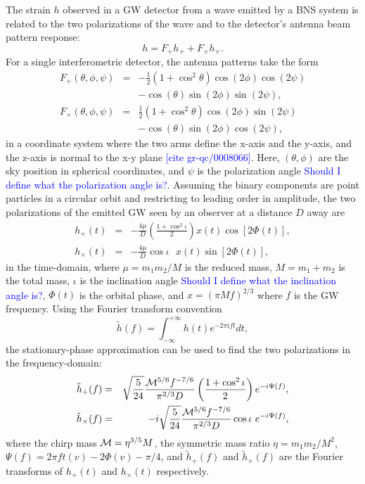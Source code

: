 \documentclass[twocolumn,prd,amssymb,aps,nofootinbib,showpacs,epsf]{revtex4}
\newcommand\les[2]{\textcolor{blue}{{#1}\sout{#2}}}
\begin{document}
The strain $h$ observed in a GW detector from a wave emitted by a BNS system is related to the two polarizations of the wave and to the detector's antenna beam pattern response:
\begin{equation}
h=F_+ h_+ + F_\times h_\times.
\end{equation}
For a single interferometric detector, the antenna patterns take the form
\begin{eqnarray}
F_+(\theta,\phi,\psi)&=&-\frac{1}{2}(1+\cos^2\theta)\cos(2\phi)\cos(2\psi)\\
\nonumber
&&-\cos(\theta)\sin(2\phi)\sin(2\psi),\\
F_\times(\theta,\phi,\psi)&=&\frac{1}{2}(1+\cos^2\theta)\cos(2\phi)\sin(2\psi)\\
\nonumber
&&-\cos(\theta)\sin(2\phi)\cos(2\psi),
\end{eqnarray}
in a coordinate system where the two arms define the x-axis and the y-axis, and the z-axis is normal to the x-y plane \les{[cite gr-qc/0008066]}{}.  Here, $(\theta, \phi)$ are the sky position in spherical coordinates, and $\psi$ is the polarization angle \les{Should I define what the polarization angle is?}{}.  Assuming the binary components are point particles in a circular orbit and restricting to leading order in amplitude, the two polarizations of the emitted GW seen by an observer at a distance $D$ away are
\begin{eqnarray}
\label{eq:hoftp}
h_+(t)&=&-\frac{4\mu}{D}\left(\frac{1+\cos^2\iota}{2}\right)x(t)\cos\left[2\Phi(t)\right],\\
\label{eq:hoftc}
h_\times(t)&=&-\frac{4\mu}{D}\cos\iota\mbox{ }x(t)\sin\left[2\Phi(t)\right],
\end{eqnarray}
in the time-domain, where $\mu=m_1 m_2/M$ is the reduced mass, $M=m_1+m_2$ is the total mass, $\iota$ is the inclination angle \les{Should I define what the inclination angle is?}{}, $\Phi(t)$ is the orbital phase, and $x=(\pi M f)^{2/3}$ where $f$ is the GW frequency.  Using the Fourier transform convention
\begin{equation}
\tilde{h}(f)=\int_{-\infty}^{+\infty} h(t) e^{-2\pi i f t}dt,
\end{equation}
the stationary-phase approximation can be used to find the two polarizations in the frequency-domain:
\begin{eqnarray}
\label{eq:hoffp}
\tilde{h}_+(f)&=&\sqrt{\frac{5}{24}}\frac{{\cal M}^{5/6}f^{-7/6}}{\pi^{2/3}D}\left(\frac{1+\cos^2\iota}{2}\right)e^{-i\Psi(f)},\\
\label{eq:hoffc}
\tilde{h}_\times(f)&=&-i\sqrt{\frac{5}{24}}\frac{{\cal M}^{5/6}f^{-7/6}}{\pi^{2/3}D}\cos\iota\mbox{ }e^{-i\Psi(f)},
\end{eqnarray}
where the chirp mass ${\cal M}=\eta^{3/5}M$, the symmetric mass ratio $\eta=m_1 m_2/M^2$, $\Psi(f)=2\pi f t(v) - 2\Phi(v) - \pi/4$, and $\tilde{h}_+(f)$ and $\tilde{h}_\times(f)$ are the Fourier transforms of $h_+(t)$ and $h_\times(t)$ respectively.
\end{document}
